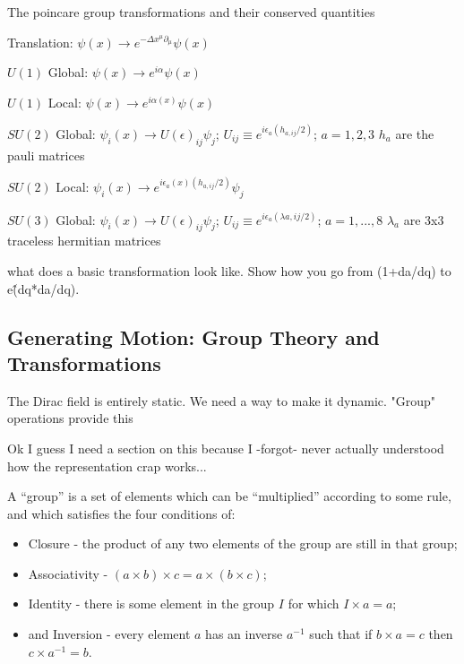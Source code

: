         The poincare group transformations and their conserved quantities
            
            Translation: $\psi(x) \rightarrow e^{-\Delta x^{\mu} \partial_{\mu}} \psi(x)$

            $U(1)$ Global: $\psi(x) \rightarrow e^{i \alpha} \psi(x)$

            $U(1)$ Local: $\psi(x) \rightarrow e^{i \alpha(x)} \psi(x)$

            $SU(2)$ Global:  $\psi_i(x) \rightarrow  U(\epsilon)_{ij} \psi_j$; $U_{ij} \equiv e^{i \epsilon_a (h_{a,ij} / 2)}$; $a=1,2,3$
                $h_a$ are the pauli matrices

            $SU(2)$ Local:  $\psi_i(x) \rightarrow  e^{i \epsilon_a(x) (h_{a,ij} / 2)} \psi_j$

            $SU(3)$ Global:  $\psi_i(x) \rightarrow  U(\epsilon)_{ij} \psi_j$; $U_{ij} \equiv e^{i \epsilon_a (\lambda{a,ij} / 2)}$; $a=1,..., 8$
                $\lambda_a$ are 3x3 traceless hermitian matrices
            

        what does a basic transformation look like. Show how you go from (1+da/dq) to e\^(dq*da/dq).



    \subsection{Generating Motion: Group Theory and Transformations}

        The Dirac field is entirely static. We need a way to make it dynamic. "Group" operations provide this
        
        Ok I guess I need a section on this because I -forgot- never actually understood how the representation crap works...

        A ``group'' is a set of elements which can be ``multiplied'' according to some rule,
            and which satisfies the four conditions of:
                \begin{itemize}
                    \item Closure - the product of any two elements of the group are still in that group;
                    \item Associativity - $(a \times b)\times c = a\times(b \times c)$;
                    \item Identity - there is some element in the group $I$ for which $I \times a=a$;
                    \item and Inversion - every element $a$ has an inverse $a^{-1}$ such that if $b \times a = c$ then $c \times a^{-1} = b$.
                \end{itemize}

